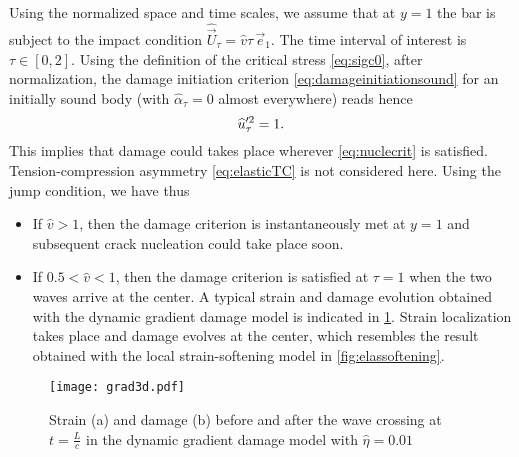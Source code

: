 Using the normalized space and time scales, we assume that at $y=1$ the bar is subject to the impact condition $\widehat{\vec{U}}_\tau=\widehat{v}\tau\,\vec{e}_1$. The time interval of interest is $\tau\in[0,2]$. Using the definition of the critical stress \eqref{eq:sigc0}, after normalization, the damage initiation criterion \eqref{eq:damageinitiationsound} for an initially sound body (with $\widehat{\alpha}_\tau=0$ almost everywhere) reads hence
\begin{equation} \label{eq:nuclecrit}
\widehat{u}_\tau'^2=1.
\end{equation}
This implies that damage could takes place wherever \eqref{eq:nuclecrit} is satisfied. Tension-compression asymmetry \eqref{eq:elasticTC} is not considered here. Using the jump condition, we have thus
\begin{itemize}
\item If $\widehat{v}>1$, then the damage criterion is instantaneously met at $y=1$ and subsequent crack nucleation could take place soon.
\item If $0.5<\widehat{v}<1$, then the damage criterion is satisfied at $\tau=1$ when the two waves arrive at the center. A typical strain and damage evolution obtained with the dynamic gradient damage model is indicated in \cref{fig:grad3d}. Strain localization takes place and damage evolves at the center, which resembles the result obtained with the local strain-softening model in \cref{fig:elassoftening}.
\end{itemize}
\begin{figure}[htbp]
\centering
\texttt{[image: grad3d.pdf]}
\caption{Strain (a) and damage (b) before and after the wave crossing at $t=\frac{L}{c}$ in the dynamic gradient damage model with $\widehat{\eta}=0.01$} \label{fig:grad3d}
\end{figure}

